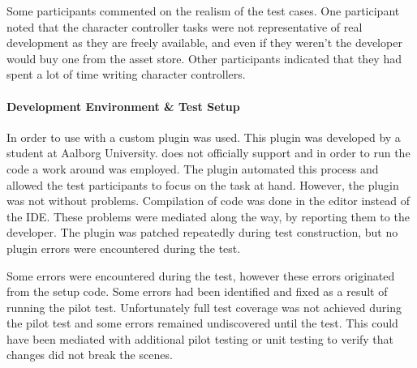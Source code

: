 Some participants commented on the realism of the test cases. One participant noted that the character controller tasks were not representative of real development as they are freely available, and even if they weren't the developer would buy one from the asset store. Other participants indicated that they had spent a lot of time writing character controllers.

\paragraph{Development Environment \& Test Setup}
In order to use \fs with \unity a custom plugin was used. This plugin was developed by a student at Aalborg University\cite{fsharp2019plugin}. \unity does not officially support \fs and in order to run the \fs code a work around was employed. The plugin automated this process and allowed the test participants to focus on the task at hand. However, the plugin was not without problems. Compilation of \fs code was done in the \unity editor instead of the \gls{IDE}. These problems were mediated along the way, by reporting them to the developer. The plugin was patched repeatedly during test construction, but no plugin errors were encountered during the test.

Some errors were encountered during the test, however these errors originated from the setup code. Some errors had been identified and fixed as a result of running the pilot test. Unfortunately full test coverage was not achieved during the pilot test and some errors remained undiscovered until the test. This could have been mediated with additional pilot testing or unit testing to verify that changes did not break the scenes.
